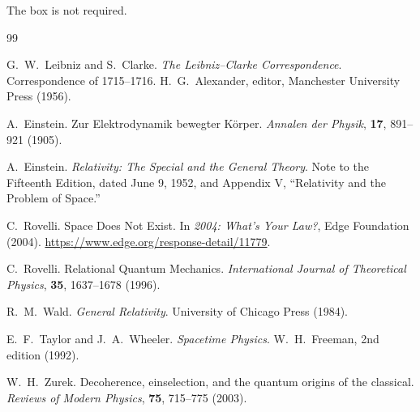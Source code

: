 \documentclass[12pt,onecolumn]{article}
\begin{document}
The box is not required.

\begin{thebibliography}{99}

G.~W.~Leibniz and S.~Clarke.
\newblock \emph{The Leibniz--Clarke Correspondence}.
\newblock Correspondence of 1715--1716.
\newblock H.~G.~Alexander, editor, Manchester University Press (1956).

A.~Einstein.
\newblock Zur Elektrodynamik bewegter K{\"o}rper.
\newblock \emph{Annalen der Physik},
\textbf{17}, 891--921 (1905).

A.~Einstein.
\newblock \emph{Relativity: The Special and the General Theory}.
\newblock Note to the Fifteenth Edition, dated June 9, 1952,
and Appendix V, ``Relativity and the Problem of Space.''

C.~Rovelli.
\newblock Space Does Not Exist.
\newblock In \emph{2004: What's Your Law?},
Edge Foundation (2004).
\newblock \url{https://www.edge.org/response-detail/11779}.

C.~Rovelli.
\newblock Relational Quantum Mechanics.
\newblock \emph{International Journal of Theoretical Physics},
\textbf{35}, 1637--1678 (1996).

R.~M.~Wald.
\newblock \emph{General Relativity}.
\newblock University of Chicago Press (1984).

E.~F.~Taylor and J.~A.~Wheeler.
\newblock \emph{Spacetime Physics}.
\newblock W.~H.~Freeman, 2nd edition (1992).

W.~H.~Zurek.
\newblock Decoherence, einselection,
and the quantum origins of the classical.
\newblock \emph{Reviews of Modern Physics},
\textbf{75}, 715--775 (2003).

\end{thebibliography}
\end{document}
